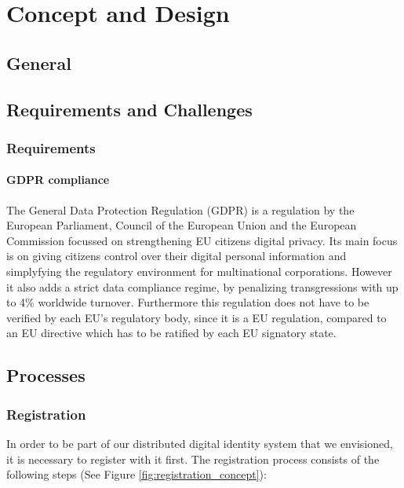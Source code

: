 \chapter{Concept and Design}
\label{cha:conceptanddesign}

\section{General}

\section{Requirements and Challenges}

\subsection{Requirements}

\subsubsection{GDPR compliance}
The General Data Protection Regulation (GDPR) is a regulation by the European Parliament, Council of the European Union and the European Commission focussed on strengthening EU citizens digital privacy.  Its main focus is on giving citizens control over their digital personal information and simplyfying the regulatory environment for multinational corporations. However it also adds a strict data compliance regime, by penalizing transgressions with up to 4\% worldwide turnover. Furthermore this regulation does not have to be verified by each EU's regulatory body, since it is a EU regulation, compared to an EU directive which has to be ratified by each EU signatory state.

\section{Processes}

\subsection{Registration}
In order to be part of our distributed digital identity system that we envisioned, it is necessary to register with it first. The registration process consists of the following steps (See Figure \ref{fig:registration_concept}):


